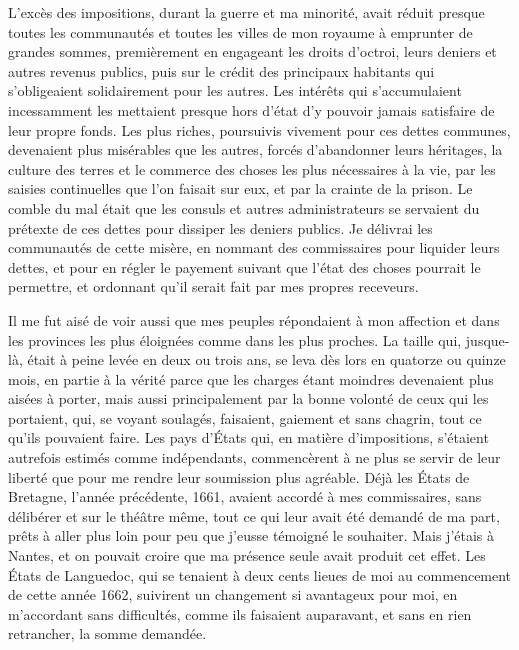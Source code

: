 \documentclass[french,twoside]{book} %
\begin{document}
L’excès des impositions, durant la guerre et ma minorité, avait réduit presque toutes les communautés et toutes les villes de mon royaume à emprunter de grandes sommes, premièrement en engageant les droits d’octroi, leurs deniers et autres revenus publics, puis sur le crédit des principaux habitants qui s’obligeaient solidairement pour les autres. Les intérêts qui s’accumulaient incessamment les mettaient presque hors d’état d’y pouvoir jamais satisfaire de leur propre fonds. Les plus riches, poursuivis vivement pour ces dettes communes, devenaient plus misérables que les autres, forcés d’abandonner leurs héritages, la culture des terres et le commerce des choses les plus nécessaires à la vie, par les saisies continuelles que l’on faisait sur eux, et par la crainte de la prison. Le comble du mal était que les consuls et autres administrateurs se servaient du prétexte de ces dettes pour dissiper les deniers publics. Je délivrai les communautés de cette misère, en nommant des commissaires pour liquider leurs dettes, et pour en régler le payement suivant que l’état des choses pourrait le permettre, et ordonnant qu’il serait fait par mes propres receveurs.\par
Il me fut aisé de voir aussi que mes peuples répondaient à mon affection et dans les provinces les plus éloignées comme dans les plus proches. La taille qui, jusque-là, était à peine levée en deux ou trois ans, se leva dès lors en quatorze ou quinze mois, en partie à la vérité parce que les charges étant moindres devenaient plus aisées à porter, mais aussi principalement par la bonne volonté de ceux qui les portaient, qui, se voyant soulagés, faisaient, gaiement et sans chagrin, tout ce qu’ils pouvaient faire. Les pays d’États qui, en matière d’impositions, s’étaient autrefois estimés comme indépendants, commencèrent à ne plus se servir de leur liberté que pour me rendre leur soumission plus agréable. Déjà les États de Bretagne, l’année précédente, 1661, avaient accordé à mes commissaires, sans délibérer et sur le théâtre même, tout ce qui leur avait été demandé de ma part, prêts à aller plus loin pour peu que j’eusse témoigné le souhaiter. Mais j’étais à Nantes, et on pouvait croire que ma présence seule avait produit cet effet. Les États de Languedoc, qui se tenaient à deux cents lieues de moi au commencement de cette année 1662, suivirent un changement si avantageux pour moi, en m’accordant sans difficultés, comme ils faisaient auparavant, et sans en rien retrancher, la somme demandée.\par
\end{document}
